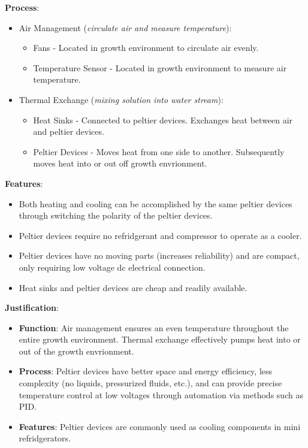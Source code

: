 \documentclass{report}
\begin{document}
\textbf{Process}:
\begin{itemize}
    \item Air Management (\textit{circulate air and measure temperature}):
    \begin{itemize}
        \item Fans - Located in growth environment to circulate air evenly.
        \item Temperature Sensor - Located in growth environment to measure air temperature.
    \end{itemize}
    \item Thermal Exchange (\textit{mixing solution into water stream}):
    \begin{itemize}
        \item Heat Sinks - Connected to peltier devices. Exchanges heat between air and peltier devices.
        \item Peltier Devices - Moves heat from one side to another. Subsequently moves heat into or out off growth envrionment.
    \end{itemize}
\end{itemize}

\textbf{Features}:
\begin{itemize}
    \item Both heating and cooling can be accomplished by the same peltier devices through switching the polarity of the peltier devices.
    \item Peltier devices require no refridgerant and compressor to operate as a cooler.
    \item Peltier devices have no moving parts (increases reliability) and are compact, only requiring low voltage dc electrical connection.
    \item Heat sinks and peltier devices are cheap and readily available.
\end{itemize}

\textbf{Justification}: 
\begin{itemize}
    \item \textbf{Function}: Air management ensures an even temperature throughout the entire growth environment. Thermal exchange effectively pumps heat into or out of the growth envrionment.
    \item \textbf{Process}:  Peltier devices have better space and energy efficiency, less complexity (no liquids, pressurized fluids, etc.), and can provide precise temperature control at low voltages through automation via methods such as PID.
    \item \textbf{Features}: Peltier devices are commonly used as cooling components in mini refridgerators.
\end{itemize}
\end{document}
